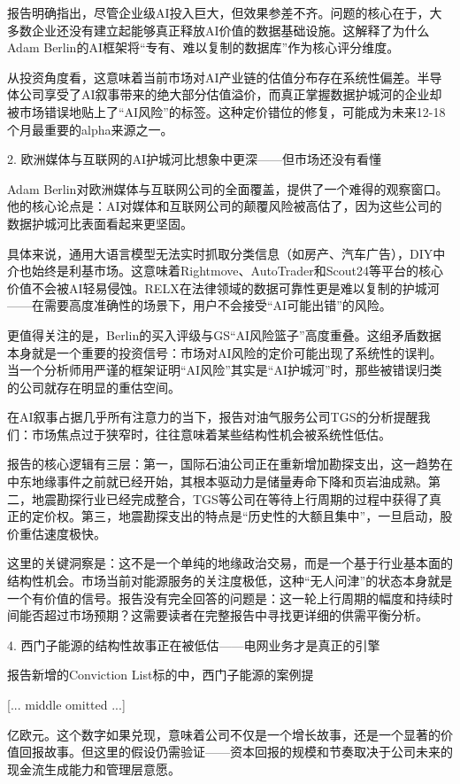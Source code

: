 \documentclass[11pt]{ctexart}
\begin{document}
报告明确指出，尽管企业级AI投入巨大，但效果参差不齐。问题的核心在于，大多数企业还没有建立起能够真正释放AI价值的数据基础设施。这解释了为什么Adam Berlin的AI框架将“专有、难以复制的数据库”作为核心评分维度。

从投资角度看，这意味着当前市场对AI产业链的估值分布存在系统性偏差。半导体公司享受了AI叙事带来的绝大部分估值溢价，而真正掌握数据护城河的企业却被市场错误地贴上了“AI风险”的标签。这种定价错位的修复，可能成为未来12-18个月最重要的alpha来源之一。

2. 欧洲媒体与互联网的AI护城河比想象中更深——但市场还没有看懂

Adam Berlin对欧洲媒体与互联网公司的全面覆盖，提供了一个难得的观察窗口。他的核心论点是：AI对媒体和互联网公司的颠覆风险被高估了，因为这些公司的数据护城河比表面看起来更坚固。

具体来说，通用大语言模型无法实时抓取分类信息（如房产、汽车广告），DIY中介也始终是利基市场。这意味着Rightmove、AutoTrader和Scout24等平台的核心价值不会被AI轻易侵蚀。RELX在法律领域的数据可靠性更是难以复制的护城河——在需要高度准确性的场景下，用户不会接受“AI可能出错”的风险。

更值得关注的是，Berlin的买入评级与GS“AI风险篮子”高度重叠。这组矛盾数据本身就是一个重要的投资信号：市场对AI风险的定价可能出现了系统性的误判。当一个分析师用严谨的框架证明“AI风险”其实是“AI护城河”时，那些被错误归类的公司就存在明显的重估空间。

在AI叙事占据几乎所有注意力的当下，报告对油气服务公司TGS的分析提醒我们：市场焦点过于狭窄时，往往意味着某些结构性机会被系统性低估。

报告的核心逻辑有三层：第一，国际石油公司正在重新增加勘探支出，这一趋势在中东地缘事件之前就已经开始，其根本驱动力是储量寿命下降和页岩油成熟。第二，地震勘探行业已经完成整合，TGS等公司在等待上行周期的过程中获得了真正的定价权。第三，地震勘探支出的特点是“历史性的大额且集中”，一旦启动，股价重估速度极快。

这里的关键洞察是：这不是一个单纯的地缘政治交易，而是一个基于行业基本面的结构性机会。市场当前对能源服务的关注度极低，这种“无人问津”的状态本身就是一个有价值的信号。报告没有完全回答的问题是：这一轮上行周期的幅度和持续时间能否超过市场预期？这需要读者在完整报告中寻找更详细的供需平衡分析。

4. 西门子能源的结构性故事正在被低估——电网业务才是真正的引擎

报告新增的Conviction List标的中，西门子能源的案例提

[... middle omitted ...]

亿欧元。这个数字如果兑现，意味着公司不仅是一个增长故事，还是一个显著的价值回报故事。但这里的假设仍需验证——资本回报的规模和节奏取决于公司未来的现金流生成能力和管理层意愿。
\end{document}
